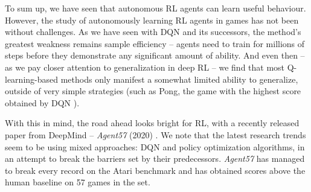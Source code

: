 To sum up, we have seen that autonomous RL agents can learn useful behaviour.
However, the study of autonomously learning RL agents in games has not been without challenges.
As we have seen with DQN and its successors, the method's greatest weakness remains sample efficiency -- agents need to train for millions of steps before they demonstrate any significant amount of ability.
And even then -- as we pay closer attention to generalization in deep RL -- we find that most Q-learning-based methods only manifest a somewhat limited ability to generalize, outside of very simple strategies (such as Pong, the game with the highest score obtained by DQN \cite{atari-dqn}).

With this in mind, the road ahead looks bright for RL, with a recently released paper from DeepMind – \emph{Agent57} (2020) \cite{agent57-paper}. We note that the latest research trends seem to be using mixed approaches: DQN and policy optimization algorithms, in an attempt to break the barriers set by their predecessors.
\emph{Agent57} has managed to break every record on the Atari benchmark and has obtained scores above the human baseline on 57 games in the set.